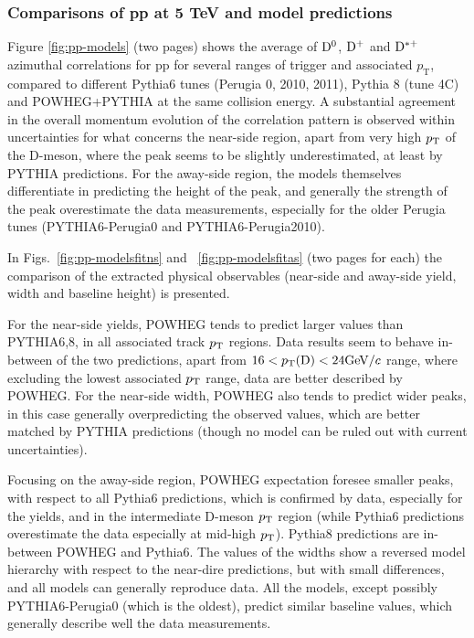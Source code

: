 \subsubsection{Comparisons of pp at 5 TeV and model predictions}
Figure \ref{fig:pp-models} (two pages) shows the average of ${\rm D^0}$, ${\rm D^+}$ and ${\rm D^{*+}}$ azimuthal correlations for pp for several ranges of trigger and associated $p_\mathrm{T}$, compared to different Pythia6 tunes (Perugia 0, 2010, 2011), Pythia 8 (tune 4C) and POWHEG+PYTHIA at the same collision energy. A substantial agreement in the overall momentum evolution of the correlation pattern is observed within uncertainties for what concerns the near-side region, apart from very high $p_{\rm T}$ of the D-meson, where the peak seems to be slightly underestimated, at least by PYTHIA predictions. For the away-side region, the models themselves differentiate in predicting the height of the peak, and generally the strength of the peak overestimate the data measurements, especially for the older Perugia tunes (PYTHIA6-Perugia0 and PYTHIA6-Perugia2010).

In Figs.~\ref{fig:pp-modelsfitns} and ~\ref{fig:pp-modelsfitas} (two pages for each) the comparison of the extracted physical observables (near-side and away-side yield, width and baseline height) is presented.

For the near-side yields, POWHEG tends to predict larger values than PYTHIA6,8, in all associated track $p_{\rm T}$ regions. Data results seem to behave in-between of the two predictions, apart from $16 < p_\text{T}({\rm D}) < 24 \mathrm{GeV}/c$ range, where excluding the lowest associated $p_{\rm T}$ range, data are better described by POWHEG.
For the near-side width, POWHEG also tends to predict wider peaks, in this case generally overpredicting the observed values, which are better matched by PYTHIA predictions (though no model can be ruled out with current uncertainties).

Focusing on the away-side region, POWHEG expectation foresee smaller peaks, with respect to all Pythia6 predictions, which is confirmed by data, especially for the yields, and in the intermediate D-meson $p_{\rm T}$ region (while Pythia6 predictions overestimate the data especially at mid-high $p_{\rm T}$). Pythia8 predictions are in-between POWHEG and Pythia6. The values of the widths show a reversed model hierarchy with respect to the near-dire predictions, but with small differences, and all models can generally reproduce data.
All the models, except possibly PYTHIA6-Perugia0 (which is the oldest), predict similar baseline values, which generally describe well the data measurements.

